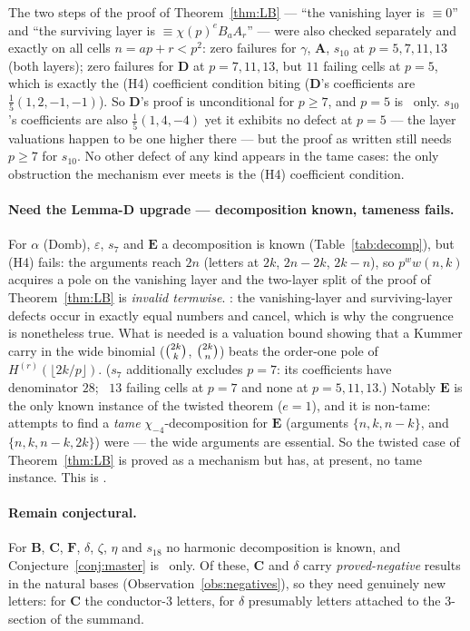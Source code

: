 The two steps of the proof of Theorem~\ref{thm:LB} --- ``the vanishing layer is
$\equiv0$'' and ``the surviving layer is $\equiv\chi(p)^eB_aA_r$'' --- were also checked
separately and exactly on all cells $n=ap+r<p^2$: zero failures for $\gamma$, $\mathbf A$,
$s_{10}$ at $p=5,7,11,13$ (both layers); zero failures for $\mathbf D$ at $p=7,11,13$, but
$11$ failing cells at $p=5$, which is exactly the (H4) coefficient condition biting
($\mathbf D$'s coefficients are $\frac15(1,2,-1,-1)$). So $\mathbf D$'s proof is
unconditional for $p\ge7$, and $p=5$ is \Verified\ only. $s_{10}$'s coefficients are also
$\frac15(1,4,-4)$ yet it exhibits no defect at $p=5$ --- the layer valuations happen to be
one higher there --- but the proof as written still needs $p\ge7$ for $s_{10}$. No other
defect of any kind appears in the tame cases: the only obstruction the mechanism ever
meets is the (H4) coefficient condition.

\paragraph{Need the Lemma-D upgrade --- decomposition known, tameness fails.}
\label{ssec:lemmaD}
For $\alpha$ (Domb), $\varepsilon$, $s_7$ and $\mathbf E$ a decomposition is known
(Table~\ref{tab:decomp}), but (H4) fails: the arguments reach $2n$ (letters at $2k$,
$2n-2k$, $2k-n$), so $p^ww(n,k)$ acquires a pole on the vanishing layer and the two-layer
split of the proof of Theorem~\ref{thm:LB} is \emph{invalid termwise}. \Verified: the
vanishing-layer and surviving-layer defects occur in exactly equal numbers and cancel,
which is why the congruence is nonetheless true. What is needed is a valuation bound
showing that a Kummer carry in the wide binomial ($\binom{2k}{k}$, $\binom{2k}{n}$) beats the
order-one pole of $H^{(r)}(\lfloor2k/p\rfloor)$. ($s_7$ additionally excludes $p=7$: its
coefficients have denominator $28$; \Verified\ $13$ failing cells at $p=7$ and none at
$p=5,11,13$.) Notably $\mathbf E$ is the only known instance of the twisted theorem
($e=1$), and it is non-tame: attempts to find a \emph{tame} $\chi_{-4}$-decomposition for
$\mathbf E$ (arguments $\{n,k,n-k\}$, and $\{n,k,n-k,2k\}$) were 
--- the wide arguments are essential. So the twisted case of Theorem~\ref{thm:LB} is
proved as a mechanism but has, at present, no tame instance. This is \Open.

\paragraph{Remain conjectural.}
For $\mathbf B$, $\mathbf C$, $\mathbf F$, $\delta$, $\zeta$, $\eta$ and $s_{18}$ no
harmonic decomposition is known, and Conjecture~\ref{conj:master} is \Verified\ only. Of
these, $\mathbf C$ and $\delta$ carry \emph{proved-negative} results in the natural bases
(Observation~\ref{obs:negatives}), so they need genuinely new letters: for $\mathbf C$ the
conductor-$3$ letters, for $\delta$ presumably letters attached to the $3$-section of the
summand.

